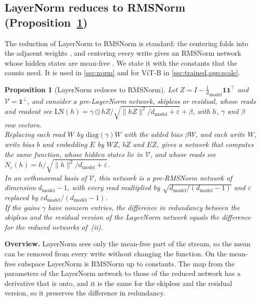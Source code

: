 \documentclass[10pt]{article}
\newtheorem{proposition}[theorem]{Proposition}
\theoremstyle{definition}
\theoremstyle{remark}
\newcommand{\dm}{d_{\mathrm{model}}}
\newcommand{\norm}[1]{\lVert #1\rVert}
\newcommand{\para}[1]{\smallskip\noindent\textbf{#1}\hspace{0.5em}}
\newcommand{\ptlabel}[1]{\phantomsection\label{#1}}
\newcommand{\stpart}[3]{\ifx\relax#1\relax\else\ptlabel{#1:#2}\fi{\upshape\bfseries\boldmath(#2)\ifx\relax#3\relax\else\ #3.\fi}}
\begin{document}
\subsection{LayerNorm reduces to RMSNorm\texorpdfstring{ (Proposition~\ref*{prop:ln})}{}}\label{app:ln}

The reduction of LayerNorm to RMSNorm is standard: the centering folds into the adjacent weights \citep{elhage2021circuits}, and centering every write gives an RMSNorm network whose hidden states are mean-free \citep{ashkboos2024slicegpt,theus2025glmc}. We state it with the constants that the counts need. It is used in \cref{sec:norm} and for ViT-B in \cref{sec:trained,app:scale}.

\begin{proposition}[LayerNorm reduces to RMSNorm]\label{prop:ln}
Let $Z = I - \tfrac1\dm\mathbf 1\mathbf 1^\top$ and $\mathcal V = \mathbf 1^\perp$, and consider a pre-LayerNorm network, skipless or residual, whose reads and readout see $\mathrm{LN}(h) = \gamma\odot hZ/\sqrt{\norm{hZ}^2/\dm + \varepsilon} + \beta$, with $h$, $\gamma$ and $\beta$ row vectors.\\
\stpart{}{i}{} Replacing each read $W$ by $\mathrm{diag}(\gamma)W$ with the added bias $\beta W$, and each write $W$, write bias $b$ and embedding $E$ by $WZ$, $bZ$ and $EZ$, gives a network that computes the same function, whose hidden states lie in $\mathcal V$, and whose reads see $N_\varepsilon(h) = h/\sqrt{\norm{h}^2/\dm + \varepsilon}$.\\
\stpart{}{ii}{} In an orthonormal basis of $\mathcal V$, this network is a pre-RMSNorm network of dimension $\dm-1$, with every read multiplied by $\sqrt{\dm/(\dm-1)}$ and $\varepsilon$ replaced by $\varepsilon \dm/(\dm-1)$.\\
\stpart{}{iii}{} If the gains $\gamma$ have nonzero entries, the difference in redundancy between the skipless and the residual version of the LayerNorm network equals the difference for the reduced networks of~(ii).
\end{proposition}

\para{Overview.} LayerNorm sees only the mean-free part of the stream, so the mean can be removed from every write without changing the function. On the mean-free subspace LayerNorm is RMSNorm up to constants. The map from the parameters of the LayerNorm network to those of the reduced network has a derivative that is onto, and it is the same for the skipless and the residual version, so it preserves the difference in redundancy.
\end{document}
